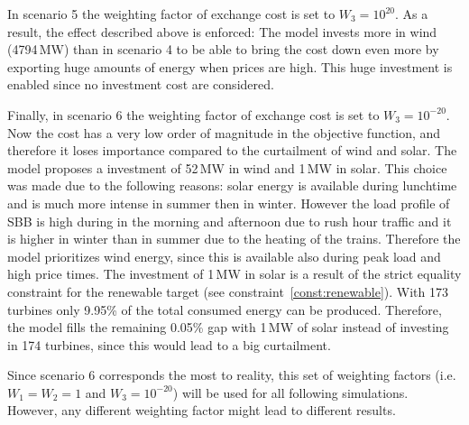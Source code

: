 In scenario 5 the weighting factor of exchange cost is set to $W_3 = 10^{20}$. As a result, the effect described above is enforced: The model invests more in wind (4794\,MW) than in scenario 4 to be able to bring the cost down even more by exporting huge amounts of  energy when prices are high. This huge investment is enabled since no investment cost are considered.

Finally, in scenario 6 the weighting factor of exchange cost is set to $W_3 = 10^{-20}$. Now the cost has a very low order of magnitude in the objective function, and therefore it loses importance compared to the curtailment of wind and solar. The model proposes a investment of 52\,MW in wind and 1\,MW in solar. This choice was made due to the following reasons: solar energy is available during lunchtime and is much more intense in summer then in winter. However the load profile of SBB is high during in the morning and afternoon due to rush hour traffic and it is higher in winter than in summer due to the heating of the trains. Therefore the model prioritizes wind energy, since this is available also during peak load and high price times. The investment of 1\,MW in solar is a result of the strict equality constraint for the renewable target (see constraint~\eqref{const:renewable}). With 173 turbines only 9.95\% of the total consumed energy can be produced. Therefore, the model fills the remaining 0.05\% gap with 1\,MW of solar instead of investing in 174 turbines, since this would lead to a big curtailment. 

Since scenario 6 corresponds the most to reality, this set of weighting factors (i.e. $W_1 = W_2 = 1$ and $W_3 = 10^{-20}$) will be used for all following simulations. However, any different weighting factor might lead to different results. 

